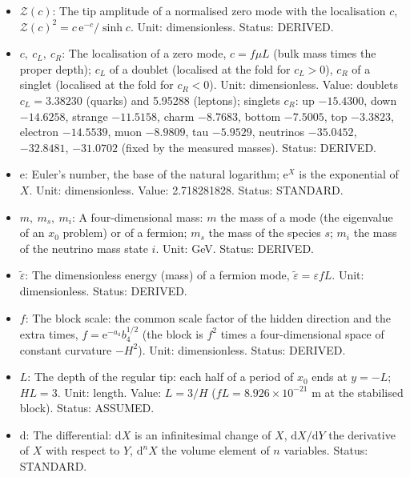 \documentclass[
  10pt,
]{article}
\providecommand{\tightlist}{%
  \setlength{\itemsep}{0pt}\setlength{\parskip}{0pt}}
\begin{document}
\begin{itemize}
\tightlist
\item
  \(\mathcal{Z}(c)\): The tip amplitude of a normalised zero mode with
  the localisation \(c\),
  \(\mathcal{Z}(c)^2 = c\,\mathrm{e}^{-c}/\sinh c\). Unit:
  dimensionless. Status: DERIVED.
\item
  \(c,\ c_L,\ c_R\): The localisation of a zero mode, \(c = f\mu L\)
  (bulk mass times the proper depth); \(c_L\) of a doublet (localised at
  the fold for \(c_L > 0\)), \(c_R\) of a singlet (localised at the fold
  for \(c_R < 0\)). Unit: dimensionless. Value: doublets
  \(c_L = 3.38230\) (quarks) and 5.95288 (leptons); singlets \(c_R\): up
  \(-15.4300\), down \(-14.6258\), strange \(-11.5158\), charm
  \(-8.7683\), bottom \(-7.5005\), top \(-3.3823\), electron
  \(-14.5539\), muon \(-8.9809\), tau \(-5.9529\), neutrinos
  \(-35.0452\), \(-32.8481\), \(-31.0702\) (fixed by the measured
  masses). Status: DERIVED.
\item
  \(\mathrm{e}\): Euler's number, the base of the natural logarithm;
  \(\mathrm{e}^{X}\) is the exponential of \(X\). Unit: dimensionless.
  Value: 2.718281828. Status: STANDARD.
\item
  \(m,\ m_s,\ m_i\): A four-dimensional mass: \(m\) the mass of a mode
  (the eigenvalue of an \(x_0\) problem) or of a fermion; \(m_s\) the
  mass of the species \(s\); \(m_i\) the mass of the neutrino mass state
  \(i\). Unit: GeV. Status: DERIVED.
\item
  \(\tilde\varepsilon\): The dimensionless energy (mass) of a fermion
  mode, \(\tilde\varepsilon = \varepsilon fL\). Unit: dimensionless.
  Status: DERIVED.
\item
  \(f\): The block scale: the common scale factor of the hidden
  direction and the extra times, \(f = \mathrm{e}^{-a_4}b_4^{1/2}\) (the
  block is \(f^2\) times a four-dimensional space of constant curvature
  \(-H^2\)). Unit: dimensionless. Status: DERIVED.
\item
  \(L\): The depth of the regular tip: each half of a period of \(x_0\)
  ends at \(y = -L\); \(HL = 3\). Unit: length. Value: \(L = 3/H\)
  (\(fL = 8.926\times10^{-21}\) m at the stabilised block). Status:
  ASSUMED.
\item
  \(\mathrm{d}\): The differential: \(\mathrm{d}X\) is an infinitesimal
  change of \(X\), \(\mathrm{d}X/\mathrm{d}Y\) the derivative of \(X\)
  with respect to \(Y\), \(\mathrm{d}^nX\) the volume element of \(n\)
  variables. Status: STANDARD.
\end{itemize}
\end{document}
